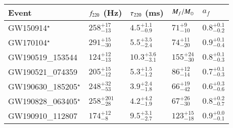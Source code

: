 
\begin{tabular}{lllll}
\toprule
Event & $f_{\text{220}}$ (Hz) & $\tau_{\text{220}}$ (ms) & $M_f/M_{\odot}$ & $a_f$ \\[0.075cm]
\midrule
\hline

GW150914$^\star$ &
$258^{+17}_{-13}$ &
$4.5^{+1.1}_{-0.9}$ &
$71^{+9}_{-10}$ &
$0.8^{+0.1}_{-0.2}$
\\[0.075cm]

GW170104$^\star$ &
$291^{+15}_{-30}$ &
$5.5^{+3.5}_{-2.4}$ &
$74^{+11}_{-20}$ &
$0.9^{+0.1}_{-0.4}$
\\[0.075cm]

GW190519\_153544 &
$124^{+12}_{-13}$ &
$10.3^{+3.6}_{-3.1}$ &
$155^{+24}_{-30}$ &
$0.8^{+0.1}_{-0.3}$
\\[0.075cm]

GW190521\_074359 &
$205^{+15}_{-12}$ &
$5.3^{+1.5}_{-1.2}$ &
$86^{+12}_{-14}$ &
$0.7^{+0.1}_{-0.3}$
\\[0.075cm]

GW190630\_185205$^\star$ &
$248^{+32}_{-53}$ &
$3.9^{+2.4}_{-1.8}$ &
$66^{+19}_{-42}$ &
$0.6^{+0.3}_{-0.6}$
\\[0.075cm]

GW190828\_063405$^\star$ &
$258^{+201}_{-28}$ &
$4.2^{+4.2}_{-1.9}$ &
$67^{+26}_{-30}$ &
$0.8^{+0.2}_{-0.7}$
\\[0.075cm]

GW190910\_112807 &
$174^{+12}_{-8}$ &
$9.5^{+3.1}_{-2.7}$ &
$123^{+15}_{-18}$ &
$0.9^{+0.0}_{-0.1}$
\\[0.075cm]

\bottomrule
\end{tabular}